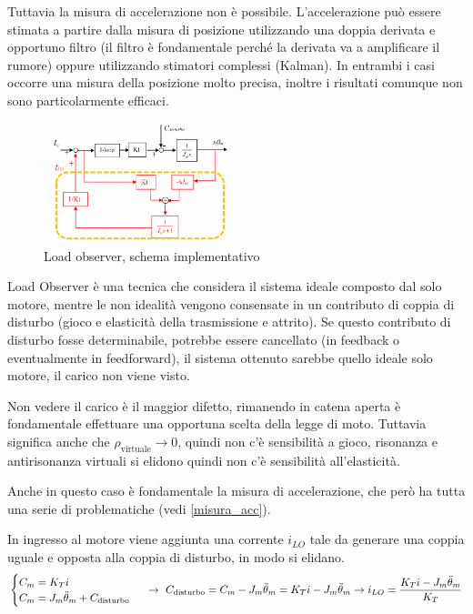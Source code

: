 Tuttavia la misura di accelerazione non è possibile. L'accelerazione può essere stimata a partire dalla misura di posizione utilizzando una doppia derivata e opportuno filtro (il filtro è fondamentale perché la derivata va a amplificare il rumore) oppure utilizzando stimatori complessi (Kalman). In entrambi i casi occorre una misura della posizione molto precisa, inoltre i risultati comunque non sono particolarmente efficaci.\label{misura_acc}


\begin{figure}[h]
    \centering
    \includegraphics[width=0.5\textwidth]{Immagini/load_observer.png}
    \caption{Load observer, schema implementativo}
\end{figure}

Load Observer è una tecnica che considera il sistema ideale composto dal solo motore, mentre le non idealità vengono consensate in un contributo di coppia di disturbo (gioco e elasticità della trasmissione e attrito).
Se questo contributo di disturbo fosse determinabile, potrebbe essere cancellato (in feedback o eventualmente in feedforward), il sistema ottenuto sarebbe quello ideale solo motore, il carico non viene visto.

Non vedere il carico è il maggior difetto, rimanendo in catena aperta è fondamentale effettuare una opportuna scelta della legge di moto.
Tuttavia significa anche che \(\rho_\text{virtuale} \rightarrow 0\), quindi non c'è sensibilità a gioco, risonanza e antirisonanza virtuali si elidono quindi non c'è sensibilità all'elasticità.

Anche in questo caso è fondamentale la misura di accelerazione, che però ha tutta una serie di problematiche (vedi \ref{misura_acc}).

In ingresso al motore viene aggiunta una corrente \(i_{LO}\) tale da generare una coppia uguale e opposta alla coppia di disturbo, in modo si elidano.
\[\begin{cases}
    C_m = K_T i \\
    C_m = J_m \Ddot{\theta}_m + C_\text{disturbo}
\end{cases} \ \rightarrow \ C_\text{disturbo} = C_m - J_m \Ddot{\theta}_m = K_T i - J_m \Ddot{\theta}_m \rightarrow i_{LO} = \frac{K_T i - J_m \Ddot{\theta}_m}{K_T} \]  

